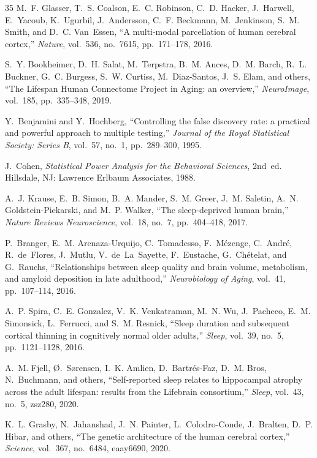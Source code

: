 \begin{thebibliography}{35}
M.~F. Glasser, T.~S. Coalson, E.~C. Robinson, C.~D. Hacker, J.~Harwell, E.~Yacoub, K.~Ugurbil, J.~Andersson, C.~F. Beckmann, M.~Jenkinson, S.~M. Smith, and D.~C. Van~Essen,
``A multi-modal parcellation of human cerebral cortex,''
\textit{Nature}, vol.~536, no.~7615, pp.~171--178, 2016.

S.~Y. Bookheimer, D.~H. Salat, M.~Terpstra, B.~M. Ances, D.~M. Barch, R.~L. Buckner, G.~C. Burgess, S.~W. Curtiss, M.~Diaz-Santos, J.~S. Elam, and others,
``The Lifespan Human Connectome Project in Aging: an overview,''
\textit{NeuroImage}, vol.~185, pp.~335--348, 2019.

Y.~Benjamini and Y.~Hochberg,
``Controlling the false discovery rate: a practical and powerful approach to multiple testing,''
\textit{Journal of the Royal Statistical Society: Series B}, vol.~57, no.~1, pp.~289--300, 1995.

J.~Cohen,
\textit{Statistical Power Analysis for the Behavioral Sciences}, 2nd~ed.
Hillsdale, NJ: Lawrence Erlbaum Associates, 1988.

A.~J. Krause, E.~B. Simon, B.~A. Mander, S.~M. Greer, J.~M. Saletin, A.~N. Goldstein-Piekarski, and M.~P. Walker,
``The sleep-deprived human brain,''
\textit{Nature Reviews Neuroscience}, vol.~18, no.~7, pp.~404--418, 2017.

P.~Branger, E.~M. Arenaza-Urquijo, C.~Tomadesso, F.~M{\'e}zenge, C.~Andr{\'e}, R.~de~Flores, J.~Mutlu, V.~de~La~Sayette, F.~Eustache, G.~Ch{\'e}telat, and G.~Rauchs,
``Relationships between sleep quality and brain volume, metabolism, and amyloid deposition in late adulthood,''
\textit{Neurobiology of Aging}, vol.~41, pp.~107--114, 2016.

A.~P. Spira, C.~E. Gonzalez, V.~K. Venkatraman, M.~N. Wu, J.~Pacheco, E.~M. Simonsick, L.~Ferrucci, and S.~M. Resnick,
``Sleep duration and subsequent cortical thinning in cognitively normal older adults,''
\textit{Sleep}, vol.~39, no.~5, pp.~1121--1128, 2016.

A.~M. Fjell, {\O}.~S{\o}rensen, I.~K. Amlien, D.~Bartr{\'e}s-Faz, D.~M. Bros, N.~Buchmann, and others,
``Self-reported sleep relates to hippocampal atrophy across the adult lifespan: results from the Lifebrain consortium,''
\textit{Sleep}, vol.~43, no.~5, zsz280, 2020.

K.~L. Grasby, N.~Jahanshad, J.~N. Painter, L.~Colodro-Conde, J.~Bralten, D.~P. Hibar, and others,
``The genetic architecture of the human cerebral cortex,''
\textit{Science}, vol.~367, no.~6484, eaay6690, 2020.


\end{thebibliography}
